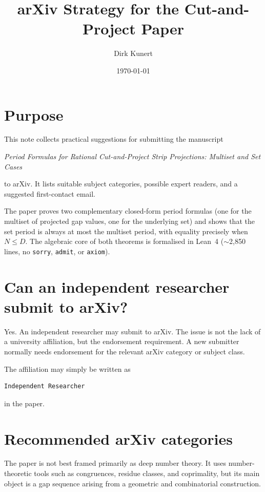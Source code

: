 \documentclass[11pt]{article}
\title{arXiv Strategy for the Cut-and-Project Paper}
\author{Dirk Kunert}
\date{\today}
\begin{document}
\maketitle

\section*{Purpose}

This note collects practical suggestions for submitting the manuscript

\begin{center}
\emph{Period Formulas for Rational Cut-and-Project Strip Projections:
Multiset and Set Cases}
\end{center}

to arXiv.  It lists suitable subject categories, possible expert readers,
and a suggested first-contact email.

The paper proves two complementary closed-form period formulas (one for
the multiset of projected gap values, one for the underlying set) and
shows that the set period is always at most the multiset period, with
equality precisely when \(N \le D\).  The algebraic core of both
theorems is formalised in Lean~4 (\(\sim\)2{,}850 lines, no
\texttt{sorry}, \texttt{admit}, or \texttt{axiom}).

\section*{Can an independent researcher submit to arXiv?}

Yes.  An independent researcher may submit to arXiv.  The issue is not the
lack of a university affiliation, but the endorsement requirement.  A new
submitter normally needs endorsement for the relevant arXiv category or
subject class.

The affiliation may simply be written as

\begin{verbatim}
Independent Researcher
\end{verbatim}

in the paper.

\section*{Recommended arXiv categories}

The paper is not best framed primarily as deep number theory.  It uses
number-theoretic tools such as congruences, residue classes, and coprimality,
but its main object is a gap sequence arising from a geometric and
combinatorial construction.
\end{document}
